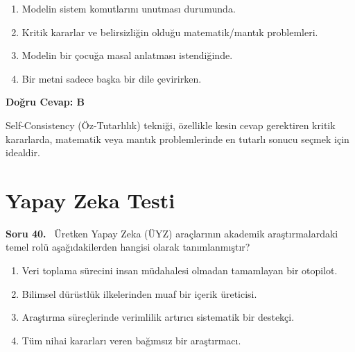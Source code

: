 \documentclass[11pt,a4paper,openany]{book}
\begin{document}
\begin{enumerate}[label=\Alph*), leftmargin=25pt, topsep=4pt, itemsep=2pt]
        \item Modelin sistem komutlarını unutması durumunda.
        \item Kritik kararlar ve belirsizliğin olduğu matematik/mantık problemleri.
        \item Modelin bir çocuğa masal anlatması istendiğinde.
        \item Bir metni sadece başka bir dile çevirirken.
\end{enumerate}

\vspace{4pt}
\begin{tcolorbox}[title=Cevap ve Açıklama, colback=gray!3!white, colframe=primarycolor!90!black, arc=2mm, fonttitle=\bfseries\sffamily, top=6pt, bottom=6pt]
    \textbf{Doğru Cevap: B}

    \vspace{2pt}
    Self-Consistency (Öz-Tutarlılık) tekniği, özellikle kesin cevap gerektiren kritik kararlarda, matematik veya mantık problemlerinde en tutarlı sonucu seçmek için idealdir.
\end{tcolorbox}
\vspace{10pt}

\newpage
\section{Yapay Zeka Testi}
\needspace{5cm}
\vspace{8pt}
\noindent\textbf{\large\sffamily Soru 40.} \ Üretken Yapay Zeka (ÜYZ) araçlarının akademik araştırmalardaki temel rolü aşağıdakilerden hangisi olarak tanımlanmıştır?

\begin{enumerate}[label=\Alph*), leftmargin=25pt, topsep=4pt, itemsep=2pt]
        \item Veri toplama sürecini insan müdahalesi olmadan tamamlayan bir otopilot.
        \item Bilimsel dürüstlük ilkelerinden muaf bir içerik üreticisi.
        \item Araştırma süreçlerinde verimlilik artırıcı sistematik bir destekçi.
        \item Tüm nihai kararları veren bağımsız bir araştırmacı.
\end{enumerate}
\end{document}
